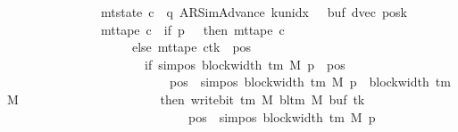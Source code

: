 \begin{isabellebody}
\ \ \ \ \ \ \ \ \ \ \ \ \ \ {\isasymand}\ mt{\isacharunderscore}{\kern0pt}state\ c{\isacharprime}{\kern0pt}{\isacharprime}{\kern0pt}\ {\isacharequal}{\kern0pt}\ {\isacharparenleft}{\kern0pt}q{\isacharcomma}{\kern0pt}\ AR{\isacharunderscore}{\kern0pt}SimAdvance{\isacharcomma}{\kern0pt}\ k{\isacharunderscore}{\kern0pt}unidx\ {}{\isacharcomma}{\kern0pt}\ {}{\isacharcomma}{\kern0pt}\ buf{\isacharcomma}{\kern0pt}\ dvec{\isacharcomma}{\kern0pt}\ posk{\isacharparenright}{\kern0pt}\isanewline
\ \ \ \ \ \ \ \ \ \ \ \ \ \ {\isasymand}\ mt{\isacharunderscore}{\kern0pt}tape\ c{\isacharprime}{\kern0pt}{\isacharprime}{\kern0pt}\ {\isacharequal}{\kern0pt}\ {\isacharparenleft}{\kern0pt}if\ p\ {\isacharequal}{\kern0pt}\ {}\ then\ mt{\isacharunderscore}{\kern0pt}tape\ c{\isacharprime}{\kern0pt}\isanewline
\ \ \ \ \ \ \ \ \ \ \ \ \ \ \ \ \ \ \ \ else\ {\isacharparenleft}{\kern0pt}mt{\isacharunderscore}{\kern0pt}tape\ c{\isacharprime}{\kern0pt}{\isacharparenright}{\kern0pt}{\isacharparenleft}{\kern0pt}tk\ {\isacharcolon}{\kern0pt}{\isacharequal}{\kern0pt}\ {\isacharparenleft}{\kern0pt}{\isasymlambda}pos{\isachardot}{\kern0pt}\isanewline
\ \ \ \ \ \ \ \ \ \ \ \ \ \ \ \ \ \ \ \ \ \ if\ sim{\isacharunderscore}{\kern0pt}pos\ {\isacharparenleft}{\kern0pt}block{\isacharunderscore}{\kern0pt}width\ {\isacharparenleft}{\kern0pt}{\isasymGamma}{\isacharunderscore}{\kern0pt}tm\ M{\isacharparenright}{\kern0pt}{\isacharparenright}{\kern0pt}\ p\ {\isasymle}\ pos\isanewline
\ \ \ \ \ \ \ \ \ \ \ \ \ \ \ \ \ \ \ \ \ \ \ \ \ {\isasymand}\ pos\ {\isacharless}{\kern0pt}\ sim{\isacharunderscore}{\kern0pt}pos\ {\isacharparenleft}{\kern0pt}block{\isacharunderscore}{\kern0pt}width\ {\isacharparenleft}{\kern0pt}{\isasymGamma}{\isacharunderscore}{\kern0pt}tm\ M{\isacharparenright}{\kern0pt}{\isacharparenright}{\kern0pt}\ p\ {\isacharplus}{\kern0pt}\ block{\isacharunderscore}{\kern0pt}width\ {\isacharparenleft}{\kern0pt}{\isasymGamma}{\isacharunderscore}{\kern0pt}tm\ M{\isacharparenright}{\kern0pt}\isanewline
\ \ \ \ \ \ \ \ \ \ \ \ \ \ \ \ \ \ \ \ \ \ then\ write{\isacharunderscore}{\kern0pt}bit\ {\isacharparenleft}{\kern0pt}{\isasymGamma}{\isacharunderscore}{\kern0pt}tm\ M{\isacharparenright}{\kern0pt}\ {\isacharparenleft}{\kern0pt}bl{\isacharunderscore}{\kern0pt}tm\ M{\isacharparenright}{\kern0pt}\ {\isacharparenleft}{\kern0pt}buf\ tk{\isacharparenright}{\kern0pt}\isanewline
\ \ \ \ \ \ \ \ \ \ \ \ \ \ \ \ \ \ \ \ \ \ \ \ \ \ \ \ \ {\isacharparenleft}{\kern0pt}pos\ {\isacharminus}{\kern0pt}\ sim{\isacharunderscore}{\kern0pt}pos\ {\isacharparenleft}{\kern0pt}block{\isacharunderscore}{\kern0pt}width\ {\isacharparenleft}{\kern0pt}{\isasymGamma}{\isacharunderscore}{\kern0pt}tm\ M{\isacharparenright}{\kern0pt}{\isacharparenright}{\kern0pt}\ p{\isacharparenright}{\kern0pt}\isanewline

\end{isabellebody}
